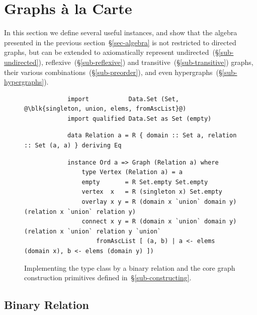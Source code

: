 \section{Graphs \`{a} la Carte}\label{sec-a-la-carte}

In this section we define several useful  instances, and
show that the algebra presented in the previous section~\S\ref{sec-algebra} is
not restricted
to directed graphs, but can be extended to axiomatically represent
undirected~(\S\ref{sub-undirected}), reflexive~(\S\ref{sub-reflexive})
and transitive~(\S\ref{sub-transitive}) graphs, their various
combinations~(\S\ref{sub-preorder}), and even hypergraphs~(\S\ref{sub-hypergraphs}).

\begin{figure}
\begin{verbatim}
            import           Data.Set (Set, @\blk{singleton, union, elems, fromAscList}@)
            import qualified Data.Set as Set (empty)
\end{verbatim}
\vspace{1mm}
\begin{verbatim}
            data Relation a = R { domain :: Set a, relation :: Set (a, a) } deriving Eq
\end{verbatim}
\vspace{1mm}
\begin{verbatim}
            instance Ord a => Graph (Relation a) where
                type Vertex (Relation a) = a
                empty       = R Set.empty Set.empty
                vertex  x   = R (singleton x) Set.empty
                overlay x y = R (domain x `union` domain y) (relation x `union` relation y)
                connect x y = R (domain x `union` domain y) (relation x `union` relation y `union`
                    fromAscList [ (a, b) | a <- elems (domain x), b <- elems (domain y) ])
\end{verbatim}
\vspace{-2.5mm}
\caption{Implementing the  type class by a binary relation
and the core graph construction primitives
defined in~\S\ref{sub-constructing}.\label{fig-relation}}
\vspace{-2.5mm}
\end{figure}

\subsection{Binary Relation}\label{sub-relation}

